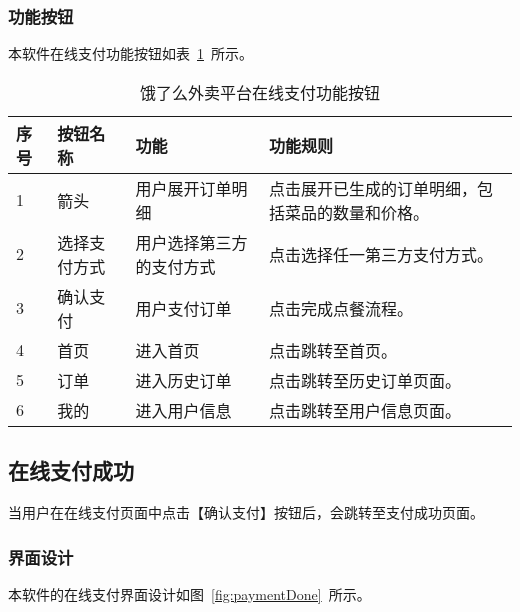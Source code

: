 \subsubsection{功能按钮}
本软件在线支付功能按钮如表~\ref{tab:table6}~所示。
\begin{table}[htbp]
    \caption{饿了么外卖平台在线支付功能按钮}\label{tab:table6}
    \vspace{0.5em}\wuhao
    \begin{tabularx}{\textwidth}{lllX}
    \toprule[1.5pt]
    序号 & 按钮名称 & 功能 & 功能规则 \\ 
    \midrule[1pt]
    1 & 箭头 & 用户展开订单明细 & 点击展开已生成的订单明细，包括菜品的数量和价格。 \\
    2 & 选择支付方式 & 用户选择第三方的支付方式 & 点击选择任一第三方支付方式。 \\
    3 & 确认支付 & 用户支付订单 & 点击完成点餐流程。 \\
    4 & 首页 & 进入首页 & 点击跳转至首页。 \\
    5 & 订单 & 进入历史订单 & 点击跳转至历史订单页面。 \\
    6 & 我的 & 进入用户信息 & 点击跳转至用户信息页面。 \\
\bottomrule[1.5pt]
\end{tabularx}
\vspace{\baselineskip}
\end{table}

\subsection{在线支付成功}
当用户在在线支付页面中点击【确认支付】按钮后，会跳转至支付成功页面。
\subsubsection{界面设计}
本软件的在线支付界面设计如图~\ref{fig:paymentDone}~所示。
